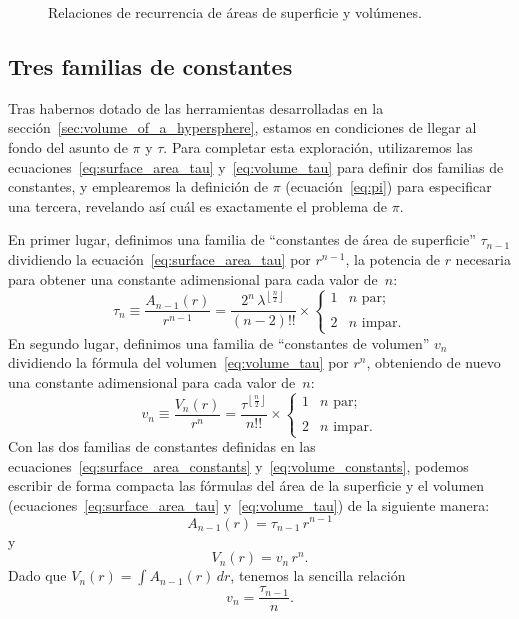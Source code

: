 \begin{figure}
\caption{Relaciones de recurrencia de áreas de superficie y volúmenes.\label{fig:Nspheres}}
\end{figure}





  \subsection{Tres familias de constantes} %
  \label{sec:three_families_of_constants}

Tras habernos dotado de las herramientas desarrolladas en la sección~\ref{sec:volume_of_a_hypersphere}, estamos en condiciones de llegar al fondo del asunto de $\pi$ y $\tau$. Para completar esta exploración, utilizaremos las ecuaciones~\eqref{eq:surface_area_tau} y~\eqref{eq:volume_tau} para definir dos familias de constantes, y emplearemos la definición de $\pi$ (ecuación~\eqref{eq:pi}) para especificar una tercera, revelando así cuál es exactamente el problema de $\pi$.

En primer lugar, definimos una familia de ``constantes de área de superficie'' $\tau_{n-1}$ dividiendo la ecuación~\eqref{eq:surface_area_tau} por $r^{n-1}$, la potencia de $r$ necesaria para obtener una constante adimensional para cada valor de~$n$:
\begin{equation}
\label{eq:surface_area_constants}
\tau_n \equiv \frac{A_{n-1}(r)}{r^{n-1}} = \frac{2^n\,\lambda^{\left\lfloor \frac{n}{2} \right\rfloor}}{(n-2)!!}\times 
\begin{cases}
  1 & n \text{ par}; \\ \\
  2 & n \text{ impar}.
\end{cases}
\end{equation}
En segundo lugar, definimos una familia de ``constantes de volumen'' $v_n$ dividiendo la fórmula del volumen~\eqref{eq:volume_tau} por $r^n$, obteniendo de nuevo una constante adimensional para cada valor de~$n$:
\begin{equation}
\label{eq:volume_constants}
v_n \equiv \frac{V_n(r)}{r^n} = \frac{\tau^{\left\lfloor \frac{n}{2} \right\rfloor}}{n!!} \times
\begin{cases}
  1 & n \text{ par}; \\ \\
  2 & n \text{ impar}.
\end{cases}
\end{equation}
Con las dos familias de constantes definidas en las ecuaciones~\eqref{eq:surface_area_constants} y~\eqref{eq:volume_constants}, podemos escribir de forma compacta las fórmulas del área de la superficie y el volumen (ecuaciones~\eqref{eq:surface_area_tau} y~\eqref{eq:volume_tau}) de la siguiente manera:
\[ A_{n-1}(r) = \tau_{n-1}\,r^{n-1} \]
y
\[ V_n(r) = v_n\,r^n. \]
Dado que $V_n(r) = \int A_{n-1}(r)\,dr$, tenemos la sencilla relación
\[
v_n = \frac{\tau_{n-1}}{n}.
\]


